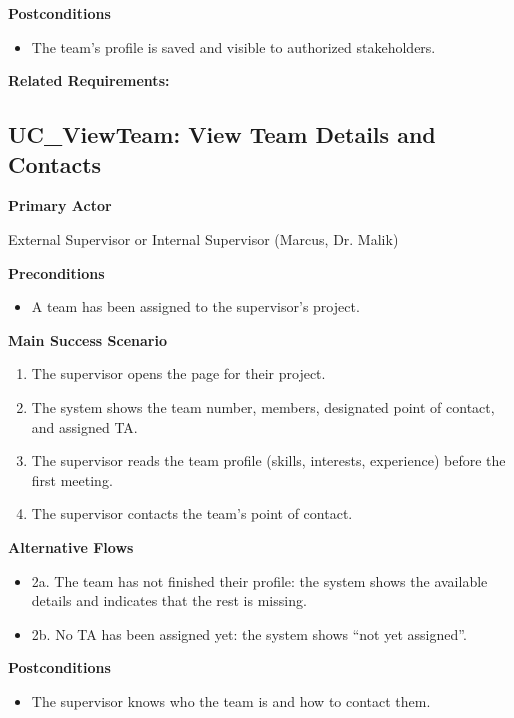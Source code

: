 \documentclass[12pt]{article}
\newcommand{\descriptiveid}[1]{\texttt{\detokenize{#1}}}
\newcommand{\idref}[1]{\hyperref[#1]{\descriptiveid{#1}}}
\newcounter{ucnum} %
\newcounter{tin}
\begin{document}
\textbf{Postconditions}
\begin{itemize}
  \item The team's profile is saved and visible to authorized stakeholders.
\end{itemize}

  \textbf{Related Requirements:} \idref{SR_StudentProfiles}

 \label{UC_ViewTeam}
\subsection{UC\_ViewTeam: View Team Details and Contacts}

\textbf{Primary Actor}

External Supervisor or Internal Supervisor (Marcus, Dr. Malik)

\textbf{Preconditions}
\begin{itemize}
  \item A team has been assigned to the supervisor's project.
\end{itemize}

\textbf{Main Success Scenario}
\begin{enumerate}
  \item The supervisor opens the page for their project.
  \item The system shows the team number, members, designated point of
    contact, and assigned TA.
  \item The supervisor reads the team profile (skills, interests,
    experience) before the first meeting.
  \item The supervisor contacts the team's point of contact.
\end{enumerate}

\textbf{Alternative Flows}
\begin{itemize}
  \item 2a. The team has not finished their profile: the system shows the
    available details and indicates that the rest is missing.
  \item 2b. No TA has been assigned yet: the system shows ``not yet
    assigned''.
\end{itemize}

\textbf{Postconditions}
\begin{itemize}
  \item The supervisor knows who the team is and how to contact them.
\end{itemize}
\end{document}
